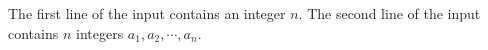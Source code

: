 The first line of the input contains an integer $n$. The second line of the input contains $n$ integers $a_1,a_2,\cdots,a_n$.